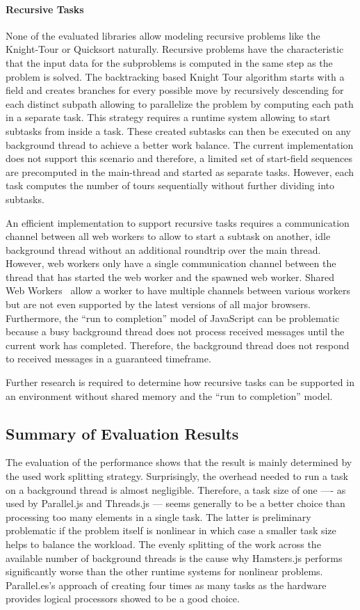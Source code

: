 \paragraph{Recursive Tasks} 
None of the evaluated libraries allow modeling recursive problems like the Knight-Tour or Quicksort naturally. Recursive problems have the characteristic that the input data for the subproblems is computed in the same step as the problem is solved. The backtracking based Knight Tour algorithm starts with a field and creates branches for every possible move by recursively descending for each distinct subpath allowing to parallelize the problem by computing each path in a separate task. This strategy requires a runtime system allowing to start subtasks from inside a task. These created subtasks can then be executed on any background thread to achieve a better work balance. The current implementation does not support this scenario and therefore, a limited set of start-field sequences are precomputed in the main-thread and started as separate tasks. However, each task computes the number of tours sequentially without further dividing into subtasks.


An efficient implementation to support recursive tasks requires a communication channel between all web workers to allow to start a subtask on another, idle background thread without an additional roundtrip over the main thread. However, web workers only have a single communication channel between the thread that has started the web worker and the spawned web worker. Shared Web Workers~\cite[section 4.6.4]{w3cWebWorker} allow a worker to have multiple channels between various workers but are not even supported by the latest versions of all major browsers. Furthermore, the \enquote{run to completion} model of JavaScript can be problematic because a busy background thread does not process received messages until the current work has completed. Therefore, the background thread does not respond to received messages in a guaranteed timeframe.

Further research is required to determine how recursive tasks can be supported in an environment without shared memory and the \enquote{run to completion} model.

\subsection{Summary of Evaluation Results}
The evaluation of the performance shows that the result is mainly determined by the used work splitting strategy. Surprisingly, the overhead needed to run a task on a background thread is almost negligible. Therefore, a task size of one ---- as used by Parallel.js and Threads.js --- seems generally to be a better choice than processing too many elements in a single task. The latter is preliminary problematic if the problem itself is nonlinear in which case a smaller task size helps to balance the workload. The evenly splitting of the work across the available number of background threads is the cause why Hamsters.js performs significantly worse than the other runtime systems for nonlinear problems. Parallel.es's approach of creating four times as many tasks as the hardware provides logical processors showed to be a good choice. 

